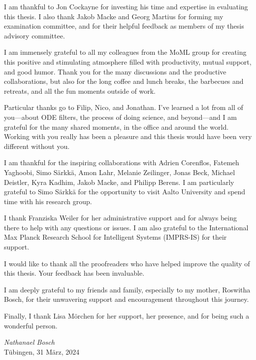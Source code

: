 \documentclass{mimosis}
\begin{document}
I am thankful to Jon Cockayne for investing his time and expertise in evaluating this thesis.
I also thank Jakob Macke and Georg Martius for forming my examination committee, and for their helpful feedback as members of my thesis advisory committee.

I am immensely grateful to all my colleagues from the MoML group for creating this positive and stimulating atmosphere filled with productivity, mutual support, and good humor.
Thank you for the many discussions and the productive collaborations, but also for the long coffee and lunch breaks, the barbecues and retreats, and all the fun moments outside of work.

Particular thanks go to Filip, Nico, and Jonathan.
I've learned a lot from all of you---about ODE filters, the process of doing science, and beyond---and I am grateful for the many shared moments, in the office and around the world.
Working with you really has been a pleasure and this thesis would have been very different without you.

I am thankful for the inspiring collaborations with Adrien Corenflos, Fatemeh Yaghoobi, Simo Särkkä, Amon Lahr, Melanie Zeilinger, Jonas Beck, Michael Deistler, Kyra Kadhim, Jakob Macke, and Philipp Berens.
I am particularly grateful to Simo Särkkä for the opportunity to visit Aalto University and spend time with his research group.

I thank Franziska Weiler for her administrative support and for always being there to help with any questions or issues.
I am also grateful to the International Max Planck Research School for Intelligent Systems (IMPRS-IS) for their support.

I would like to thank all the proofreaders who have helped improve the quality of this thesis. Your feedback has been invaluable.

I am deeply grateful to my friends and family, especially to my mother, Roswitha Bosch, for their unwavering support and encouragement throughout this journey.

Finally, I thank Lisa Mörchen for her support, her presence, and for being such a wonderful person.

\begin{flushright}
  \textit{Nathanael Bosch}\\
  Tübingen, 31 März, 2024
\end{flushright}

\clearpage
{}
\tableofcontents
\end{document}
